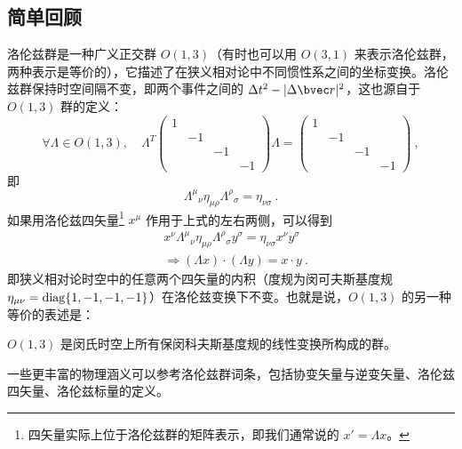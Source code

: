 

\subsection{简单回顾}
洛伦兹群是一种广义正交群 $O(1,3)$（有时也可以用 $O(3,1)$ 来表示洛伦兹群，两种表示是等价的），它描述了在狭义相对论中不同惯性系之间的坐标变换。洛伦兹群保持时空间隔不变，即两个事件之间的 $\Delta t^2-|\Delta \bvec r|^2$，这也源自于 $O(1,3)$ 群的定义：
\begin{equation}
\forall \Lambda \in O(1,3),\quad \Lambda^T \begin{pmatrix}
1&&&\\
&-1&&\\
&&-1&\\
&&&-1
\end{pmatrix}\Lambda =\begin{pmatrix}
1&&&\\
&-1&&\\
&&-1&\\
&&&-1
\end{pmatrix}~,
\end{equation}
即
\begin{equation}
\Lambda^\mu{}_{\nu} \eta_{\mu\rho}\Lambda^{\rho}{}_{\sigma}=\eta_{\nu\sigma}~.
\end{equation}
如果用洛伦兹四矢量\footnote{四矢量实际上位于洛伦兹群的矩阵表示，即我们通常说的 $x'=\Lambda x$。} $x^\mu$ 作用于上式的左右两侧，可以得到
\begin{equation}
\begin{aligned}
&x^\nu \Lambda^{\mu}{}_\nu \eta_{\mu\rho} \Lambda^\rho{}_\sigma y^\sigma=\eta_{\nu\sigma} x^\nu y^\sigma\\
&\Rightarrow (\Lambda x)\cdot (\Lambda y)=x\cdot y~.
\end{aligned}
\end{equation}
即狭义相对论时空中的任意两个四矢量的内积（度规为闵可夫斯基度规 $\eta_{\mu\nu}=\rm diag\{1,-1,-1,-1\}$）在洛伦兹变换下不变。也就是说，$O(1,3)$ 的另一种等价的表述是：
\begin{definition}{}
$O(1,3)$ 是闵氏时空上所有保闵科夫斯基度规的线性变换所构成的群。
\end{definition}
一些更丰富的物理涵义可以参考洛伦兹群词条，包括协变矢量与逆变矢量、洛伦兹四矢量、洛伦兹标量的定义。

